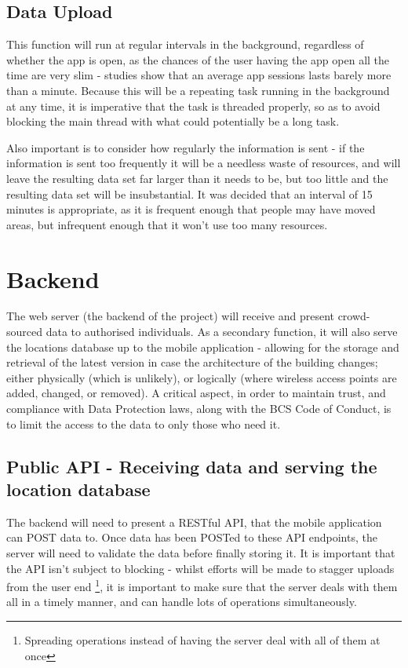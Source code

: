 \documentclass[11pt]{informatics-report}
\begin{document}
\subsection{Data Upload}

This function will run at regular intervals in the background, regardless of whether the app is open, as the chances of the user having the app open all the time are very slim - studies show that an average app sessions lasts barely more than a minute\cite{Bohmer:2011:FAA:2037373.2037383}. Because this will be a repeating task running in the background at any time, it is imperative that the task is threaded properly, so as to avoid blocking the main thread with what could potentially be a long task. 

Also important is to consider how regularly the information is sent - if the information is sent too frequently it will be a needless waste of resources, and will leave the resulting data set far larger than it needs to be, but too little and the resulting data set will be insubstantial. It was decided that an interval of 15 minutes is appropriate, as it is frequent enough that people may have moved areas, but infrequent enough that it won't use too many resources.

\section{Backend}

The web server (the backend of the project) will receive and present crowd-sourced data to authorised individuals. As a secondary function, it will also serve the locations database up to the mobile application - allowing for the storage and retrieval of the latest version in case the architecture of the building changes; either physically (which is unlikely), or logically (where wireless access points are added, changed, or removed). A critical aspect, in order to maintain trust, and compliance with Data Protection laws, along with the BCS Code of Conduct, is to limit the access to the data to only those who need it.


\subsection{Public API - Receiving data and serving the location database}

The backend will need to present a RESTful API, that the mobile application can POST data to. Once data has been POSTed to these API endpoints, the server will need to validate the data before finally storing it. It is important that the API isn't subject to blocking - whilst efforts will be made to stagger uploads from the user end \footnote{Spreading operations instead of having the server deal with all of them at once}, it is important to make sure that the server deals with them all in a timely manner, and can handle lots of operations simultaneously.
\end{document}
